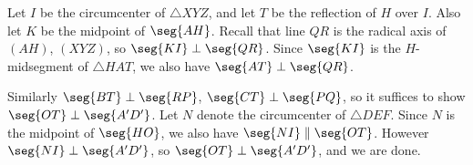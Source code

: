 Let $I$ be the circumcenter of $\triangle XYZ$, and let $T$ be the reflection of $H$ over $I$. Also let $K$ be the midpoint of $\seg{AH}$. Recall that line $QR$ is the radical axis of $(AH)$, $(XYZ)$, so $\seg{KI}\perp\seg{QR}$. Since $\seg{KI}$ is the $H$-midsegment of $\triangle HAT$, we also have $\seg{AT}\perp\seg{QR}$.

Similarly $\seg{BT}\perp\seg{RP}$, $\seg{CT}\perp\seg{PQ}$, so it suffices to show $\seg{OT}\perp\seg{A'D'}$. Let $N$ denote the circumcenter of $\triangle DEF$. Since $N$ is the midpoint of $\seg{HO}$, we also have $\seg{NI}\parallel\seg{OT}$. However $\seg{NI}\perp\seg{A'D'}$, so $\seg{OT}\perp\seg{A'D'}$, and we are done.

